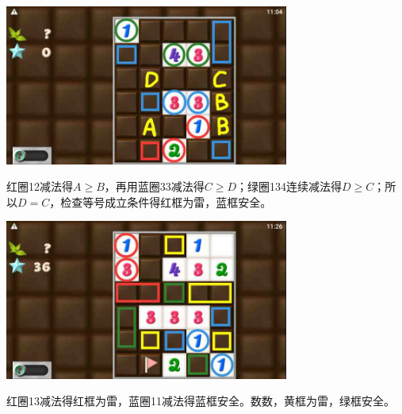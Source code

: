 \subsection{} %
\begin{center}
    \includegraphics[width=0.7\textwidth]{puzzlelow/220-1.jpg}
\end{center}
红圈12减法得$A\ge B$，再用蓝圈33减法得$C\ge D$；绿圈134连续减法得$D\ge C$；所以$D=C$，检查等号成立条件得红框为雷，蓝框安全。
\begin{center}
    \includegraphics[width=0.7\textwidth]{puzzlelow/220-2.jpg}
\end{center}
红圈13减法得红框为雷，蓝圈11减法得蓝框安全。数数，黄框为雷，绿框安全。


